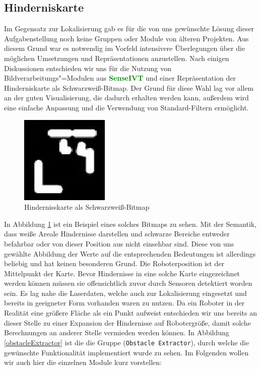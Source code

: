 \subsection{Hinderniskarte}
\label{hinderniskarte_subsec}
 Im Gegensatz zur Lokalisierung gab es für die von uns gewünschte Lösung dieser
 Aufgabenstellung noch keine Gruppen oder Module von älteren Projekten. Aus
 diesem Grund war es notwendig im Vorfeld intensivere Überlegungen über die möglichen
 Umsetzungen und Repräsentationen anzustellen.
 Nach einigen Diskussionen entschieden wir uns für die Nutzung von
 Bildverarbeitungs"=Modulen aus \textcolor{green}{\textbf{SenseIVT}}  und
 einer Repräsentation der Hinderniskarte als Schwarzweiß-Bitmap. Der Grund für diese Wahl lag vor allem an der guten
 Visualisierung, die dadurch erhalten werden kann, außerdem wird eine einfache Anpassung und die Verwendung
 von Standard-Filtern ermöglicht. 
\begin{figure}[h]
\center
\includegraphics[scale=0.7]{graphics/hinderniskarte.jpg}
\caption{\label{fig:hinderniskarte} Hindernisskarte als Schwarzweiß-Bitmap}
\end{figure}
 In Abbildung \ref{fig:hinderniskarte} ist ein Beispiel eines solches Bitmaps
 zu sehen. Mit der Semantik, dass weiße Areale Hindernisse darstellen und schwarze Bereiche entweder befahrbar
 oder von dieser Position aus nicht einsehbar sind. Diese von uns gewählte Abbildung der Werte
 auf die entsprechenden Bedeutungen ist allerdings beliebig und hat keinen besonderen Grund.
 Die Roboterposition ist der Mittelpunkt der Karte. Bevor Hindernisse in eine solche Karte eingezeichnet werden
 können müssen sie offensichtlich zuvor durch Sensoren detektiert worden sein. Es lag nahe die Laserdaten,
 welche auch zur Lokalisierung eingesetzt und bereits in geeigneter Form vorhanden waren zu nutzen.
 Da ein Roboter in der Realität eine größere Fläche als ein Punkt aufweist entschieden wir uns bereits an dieser
 Stelle zu einer Expansion der Hindernisse auf Robotergröße, damit solche Berechnungen an anderer Stelle vermieden
 werden können.
 In Abbildung \ref{obstacleExtractor} ist die die Gruppe (\lstinline{Obstacle Extractor}),
 durch welche die gewünschte Funktionalität implementiert wurde zu sehen.
 Im Folgenden wollen wir auch hier die einzelnen Module kurz vorstellen:

